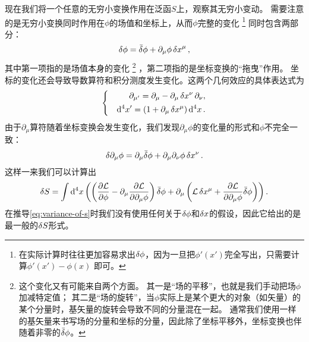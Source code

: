 \documentclass[hyperref, UTF8, a4paper]{ctexart}
\newenvironment{bigcase}{\left\{\quad\begin{aligned}}{\end{aligned}\right.}
\begin{document}
现在我们将一个任意的无穷小变换作用在泛函$S$上，观察其无穷小变动。
需要注意的是无穷小变换同时作用在$\phi$的场值和坐标上，从而$\phi$完整的变化%
\footnote{在实际计算时往往更加容易求出$\var{\phi}$，因为一旦把$\phi'(x')$完全写出，只需要计算$\phi'(x')-\phi(x)$ 即可。}%
同时包含两部分：
\begin{equation}
    \var{\phi} = \bar{\var} \phi + \partial_\mu \phi \var{x}^\mu,
    \label{eq:variance-of-phi}
\end{equation}
其中第一项指的是场值本身的变化%
\footnote{这个变化又有可能来自两个方面。
其一是“场的平移”，也就是我们手动把场$\phi$加减特定值；
其二是“场的旋转”，当$\phi$实际上是某个更大的对象（如矢量）的某个分量时，基矢量的旋转会导致不同的分量混在一起。
通常我们使用一样的基矢量来书写场的分量和坐标的分量，因此除了坐标平移外，坐标变换也伴随着非零的$\bar{\var}{\phi}$。}%
，第二项指的是坐标变换的“拖曳”作用。
坐标的变化还会导致导数算符和积分测度发生变化。这两个几何效应的具体表达式为
\begin{equation}
    \begin{bigcase}
        \partial_{\mu'} = \partial_\mu - \partial_\mu \var{x^\nu} \partial_\nu, \\
        \dd[4]{x'} = (1 + \partial_\mu \var{x^\mu}) \dd[4]{x}.
    \end{bigcase}
\end{equation}
由于$\partial_\mu$算符随着坐标变换会发生变化，我们发现$\partial_\mu \phi$的变化量的形式和$\phi$不完全一致：
\begin{equation}
    \var{\partial_\mu \phi} = \partial_\mu \bar{\var}{\phi} + \partial_\mu \partial_\nu \phi \var{x^\nu}.
\end{equation}
这样一来我们可以计算出
\begin{equation}
    \var{S} = \int \dd[4]{x} \left(
        \left( \pdv{\mathcal{L}}{\phi} - \partial_\mu \pdv{\mathcal{L}}{\partial_\mu \phi} \right) \bar{\var}{\phi} + 
        \partial_\mu \left( \mathcal{L} \var{x^\mu} + \pdv{\mathcal{L}}{\partial_\mu \phi} \bar{\var}{\phi} \right)
    \right).
    \label{eq:variance-of-s}
\end{equation}
在推导\eqref{eq:variance-of-s}时我们没有使用任何关于$\var{\phi}$和$\var{x}$的假设，因此它给出的是最一般的$\var{S}$形式。
\end{document}
